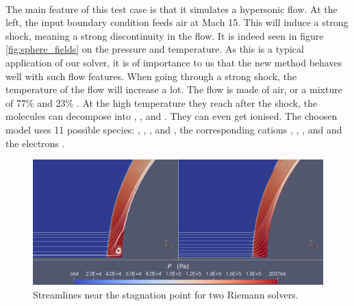         \paragraph{}
        The main feature of this test case is that it simulates a hypersonic flow.
        At the left, the input boundary condition feeds air at Mach 15.
        This will induce a strong shock, meaning a strong discontinuity in the flow.
        It is indeed seen in figure \ref{fig:sphere_fields} on the pressure and temperature.
        As this is a typical application of our solver, it is of importance to us that the new method behaves well with such flow features.
        When going through a strong shock, the temperature of the flow will increase a lot.
        The flow is made of air, or a mixture of 77\%  and 23\% .
        At the high temperature they reach after the shock, the molecules can decompose into , , and .
        They can even get ionised.
        The choosen model uses 11 possible species: , , ,  and , the corresponding cations , , ,  and  and the electrons .

        \begin{figure}
          \centering
          \includegraphics[width=\textwidth]{figures/sphere_carbuncle.png}
          \caption{Streamlines near the stagnation point for two Riemann solvers.}
          \label{fig:sphere_carbuncle}
        \end{figure}

